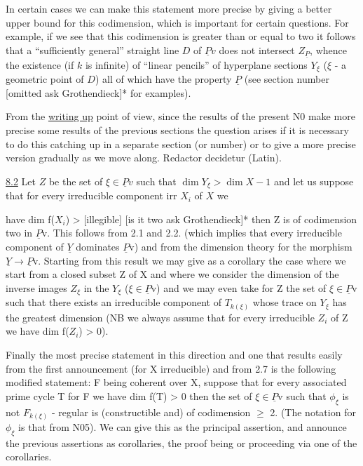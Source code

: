 \documentclass[11pt]{article}
\newcommand{\scanpage}[1]{\par\bigskip\noindent{\small\sffamily[scan #1]}\par}
\newcommand{\mspage}[1]{{\small\sffamily[p.\,#1]}}
\newcommand{\uline}[1]{\underline{#1}}
\begin{document}
In certain cases we can make this statement more precise by
giving a better upper bound for this codimension, which is
important for certain questions.  For example, if we see that this
codimension is greater than or equal to two it follows that a
``sufficiently general'' straight line $D$ of $\underline{P}v$ does not intersect $Z_{\underline{P}}$,
whence the existence (if $k$ is infinite) of ``linear pencils'' of
hyperplane sections $Y_{\xi}$ ($\xi$ - a geometric point of $D$) all of which
have the property $\underline{P}$ (see section number [omitted ask
Grothendieck]* for examples).

From the \uline{writing up} point of view, since the results of the
present N0 make more precise some results of the previous sections
the question arises if it is necessary to do this catching up in a
separate section (or number) or to give a more precise version
gradually as we move along.  Redactor decidetur (Latin).

\uline{8.2} Let $Z$ be the set of $\xi \in \underline{P}v$ such that $\dim Y_{\xi} > \dim X - 1$ and
let us suppose that for every irreducible component irr $X_i$ of $X$ we

\clearpage
\scanpage{24/37}
\mspage{37}

have dim f($X_{i}$) > [illegible] [is it two ask Grothendieck]* then Z
is of codimension two in $\underline{P}$v.  This follows from 2.1 and 2.2.
(which implies that every irreducible component of $\underline{Y}$ dominates $\underline{P}$v)
and from the dimension theory for the morphism $\underline{Y} \rightarrow \underline{P}$v.  Starting
from this result we may give as a corollary the case where we
start from a closed subset Z of X and where we consider the
dimension of the inverse images $Z_{\xi}$ in the $Y_{\xi}$ ($\xi \in \underline{P}$v) and we may
even take for Z the set of $\xi \in \underline{P}$v such that there exists an
irreducible component of $T_{k(\xi)}$ whose trace on $Y_{\xi}$ has the greatest
dimension (NB we always assume that for every irreducible $Z_{i}$ of Z
we have dim f($Z_{i}$) > 0).

Finally the most precise statement in this direction and one
that results easily from the first announcement (for X irreducible) and
from 2.7 is the following modified statement:  F being coherent
over X, suppose that for every associated prime cycle T for F we
have dim f(T) > 0 then the set of $\xi \in \underline{P}$v such that $\phi_{\xi}$ is not $F_{k(\xi)}$ -
regular is (constructible and) of codimension $\geq$ 2.  (The notation
for $\phi_{\xi}$ is that from N05).  We can give this as the principal
assertion, and announce the previous assertions as corollaries,
the proof being or proceeding via one of the corollaries.
\end{document}
